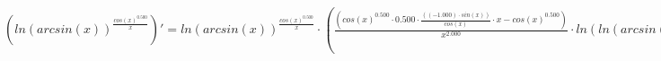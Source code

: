\documentclass[a4paper,12pt]{article}
\begin{document}
\begin{math}
	( ln ( arcsin (x) )  ^{ \frac{ cos (x)  ^{0.500} }{x} } )' =  ln ( arcsin (x) )  ^{ \frac{ cos (x)  ^{0.500} }{x} }  \cdot ( \frac{( cos (x)  ^{0.500}  \cdot 0.500 \cdot  \frac{((-1.000) \cdot  sin (x) )}{ cos (x) }  \cdot x -  cos (x)  ^{0.500} )}{x ^{2.000} }  \cdot  ln ( ln ( arcsin (x) ) )  +  \frac{( \frac{1.000}{ arcsin (x) }  \cdot  \frac{1.000}{(1.000 - x ^{2.000} ) ^{0.500} } )}{ ln ( arcsin (x) ) }  \cdot  \frac{ cos (x)  ^{0.500} }{x} )\end{math}
\end{document}

